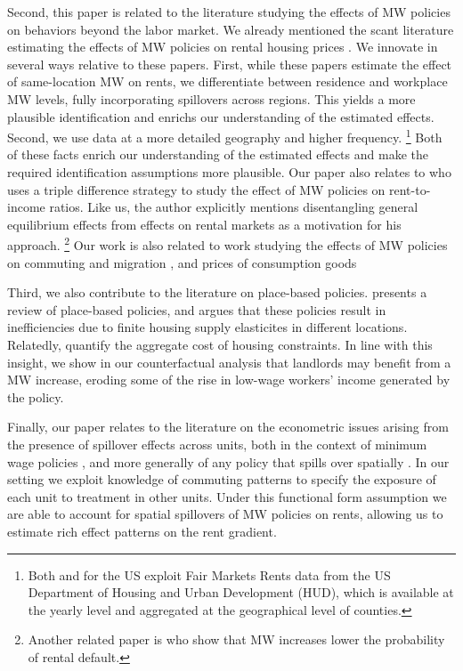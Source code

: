 Second, this paper is related to the literature studying the effects of MW 
policies on behaviors beyond the labor market.
We already mentioned the scant literature estimating the effects of MW policies
on rental housing prices \parencite{Tidemann2018, Yamagishi2021}.
We innovate in several ways relative to these papers.
First, while these papers estimate the effect of same-location MW on rents, we 
differentiate between residence and workplace MW levels, fully incorporating
spillovers across regions.
This yields a more plausible identification and enrichs our understanding of
the estimated effects.
Second, we use data at a more detailed geography and higher frequency.%
\footnote{Both \textcite{Tidemann2018} and \textcite{Yamagishi2019} for the US 
exploit Fair Markets Rents data from the US Department of Housing and Urban 
Development (HUD), which is available at the yearly level and aggregated at the 
geographical level of counties.}
Both of these facts enrich our understanding of the estimated effects and make 
the required identification assumptions more plausible.
Our paper also relates to \textcite{Hughes2020} who uses a triple difference 
strategy to study the effect of MW policies on rent-to-income ratios. Like us, 
the author explicitly mentions disentangling general equilibrium effects from 
effects on rental markets as a motivation for his approach.%
\footnote{Another related paper is \textcite{AgarwalEtAl2021} who show that MW 
increases lower the probability of rental default.}
Our work is also related to work studying the effects of MW policies on 
commuting and migration \parencite{Cadena2014, Monras2019, PerezPerez2021}, and 
prices of consumption goods \parencite{AllegrettoReich2018, Leung2021}

Third, we also contribute to the literature on place-based policies.
\textcite{KlineMoretti2014} presents a review of place-based policies, and 
argues that these policies result in inefficiencies due to finite housing supply 
elasticites in different locations.
Relatedly, \textcite{HsiehMoretti2019} quantify the aggregate cost of housing 
constraints.
In line with this insight, we show in our counterfactual analysis that landlords
may benefit from a MW increase, eroding some of the rise in low-wage workers' 
income generated by the policy.

Finally, our paper relates to the literature on the econometric issues arising 
from the presence of spillover effects across units,
both in the context of minimum wage policies \parencite{Kuehn2016, Huang2020}, 
and more generally of any policy that spills over spatially
\parencite{DelgadoFlorax2015, Butts2021}.
In our setting we exploit knowledge of commuting patterns to specify the 
exposure of each unit to treatment in other units.
Under this functional form assumption we are able to account for spatial 
spillovers of MW policies on rents, allowing us to estimate rich effect patterns 
on the rent gradient.

